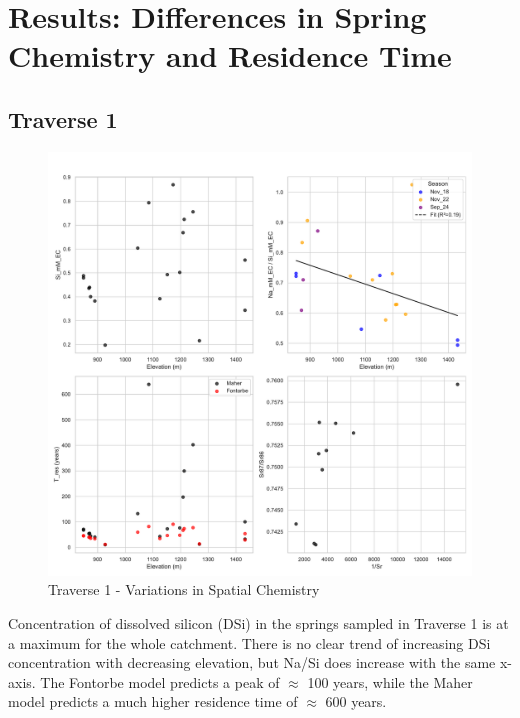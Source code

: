 
\section{Results: Differences in Spring Chemistry and Residence Time}

\subsection{Traverse 1}

\begin{figure}[h]
    \centering
        \includegraphics[width=\textwidth]{Traverse_1_summary.pdf}
    \caption{Traverse 1 - Variations in Spatial Chemistry}
    \label{fig:spatial_changes_spring1}
\end{figure}

\FloatBarrier

Concentration of dissolved silicon (DSi) in the springs sampled in Traverse 1 is at a maximum for the whole catchment. There is no clear trend of increasing DSi concentration with decreasing elevation, but Na/Si does increase with the same x-axis. The Fontorbe model predicts a peak of $\approx$ 100 years, while the Maher model predicts a much higher residence time of $\approx$ 600 years. 





